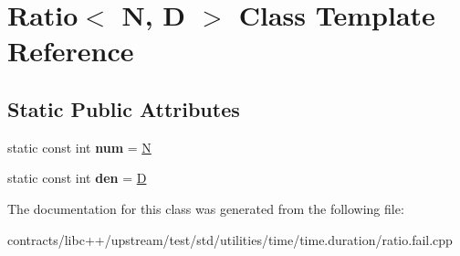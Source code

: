 \hypertarget{class_ratio}{}\section{Ratio$<$ N, D $>$ Class Template Reference}
\label{class_ratio}
\subsection*{Static Public Attributes}
\begin{DoxyCompactItemize}
\item 
\mbox{\label{class_ratio_a60f78d05ac65422fccec7d834d3de112}} 
static const int {\bfseries num} = \mbox{\hyperlink{group__types_gaf9c1edb0e0da55ec6ba09f32f6839529}{N}}
\item 
\mbox{\label{class_ratio_af190afcc455489e1ef06a4539839ee8b}} 
static const int {\bfseries den} = \mbox{\hyperlink{struct_d}{D}}
\end{DoxyCompactItemize}


The documentation for this class was generated from the following file\+:\begin{DoxyCompactItemize}
\item 
contracts/libc++/upstream/test/std/utilities/time/time.\+duration/ratio.\+fail.\+cpp\end{DoxyCompactItemize}
